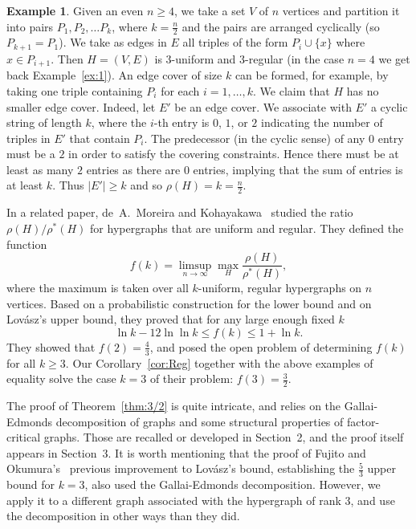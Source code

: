 \documentclass{article}
\theoremstyle{definition}
\newtheorem{example}[theorem]{Example}
\begin{document}
\begin{example} \label{ex:3}
Given an even $n \ge 4$, we take a set $V$ of $n$ vertices and partition it into pairs $P_1, P_2, \ldots P_k$, where $k = \frac{n}{2}$ and the pairs are arranged cyclically (so $P_{k+1} = P_1$). We take as edges in $E$ all triples of the form $P_i \cup \{x\}$ where $x \in P_{i+1}$. Then $H=(V,E)$ is $3$-uniform and $3$-regular (in the case $n=4$ we get back Example~\ref{ex:1}). An edge cover of size $k$ can be formed, for example, by taking one triple containing $P_i$ for each $i=1, \ldots ,k$. We claim that $H$ has no smaller edge cover. Indeed, let $E'$ be an edge cover. We associate with $E'$ a cyclic string of length $k$, where the $i$-th entry is $0$, $1$, or $2$ indicating the number of triples in $E'$ that contain $P_i$. The predecessor (in the cyclic sense) of any $0$ entry must be a $2$ in order to satisfy the covering constraints. Hence there must be at least as many $2$ entries as there are $0$ entries, implying that the sum of entries is at least $k$. Thus $|E'| \ge k$ and so $\rho(H) = k = \frac{n}{2}$.
\end{example}
In a related paper, de~A.~Moreira and Kohayakawa~\cite{dK} studied the ratio $\rho(H)/\rho^*(H)$ for hypergraphs that are uniform and regular. They defined the function \[ f(k) = \limsup_{n \to \infty} \max_H \frac{\rho(H)}{\rho^*(H)},\] where the maximum is taken over all $k$-uniform, regular hypergraphs on $n$ vertices. Based on a probabilistic construction for the lower bound and on Lov\'asz's upper bound, they proved that for any large enough fixed $k$ \[ \ln k - 12 \ln\ln k \le f(k) \le 1 + \ln k.\] They showed that $f(2) = \frac{4}{3}$, and posed the open problem of determining $f(k)$ for all $k \ge 3$. Our Corollary~\ref{cor:Reg} together with the above examples of equality solve the case $k=3$ of their problem: $f(3) = \frac{3}{2}$.

The proof of Theorem~\ref{thm:3/2} is quite intricate, and relies on the Gallai-Edmonds decomposition of graphs and some structural properties of factor-critical graphs. Those are recalled or developed in Section~2, and the proof itself appears in Section~3. It is worth mentioning that the proof of Fujito and Okumura's~\cite{FO} previous improvement to Lov\'asz's bound, establishing the $\frac{5}{3}$ upper bound for $k=3$, also used the Gallai-Edmonds decomposition. However, we apply it to a different graph associated with the hypergraph of rank $3$, and use the decomposition in other ways than they did.
\end{document}
